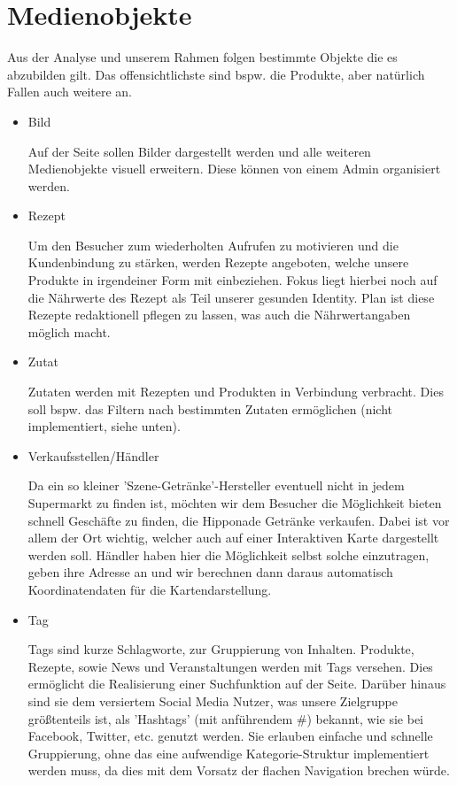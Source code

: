 \documentclass[12pt,a4paper,oneside,ngerman]{article}
\begin{document}
\section{Medienobjekte} %
Aus der Analyse und unserem Rahmen folgen bestimmte Objekte die es abzubilden gilt. Das offensichtlichste sind bspw. die Produkte, aber natürlich Fallen auch weitere an.
\begin{itemize}
\item Bild

Auf der Seite sollen Bilder dargestellt werden und alle weiteren Medienobjekte visuell erweitern. Diese können von einem Admin organisiert werden.

\item Rezept

Um den Besucher zum wiederholten Aufrufen zu motivieren und die Kundenbindung zu stärken, werden Rezepte angeboten, welche unsere Produkte in irgendeiner Form mit einbeziehen.
Fokus liegt hierbei noch auf die Nährwerte des Rezept als Teil unserer gesunden Identity.
Plan ist diese Rezepte redaktionell pflegen zu lassen, was auch die Nährwertangaben möglich macht.

\item Zutat

Zutaten werden mit Rezepten und Produkten in Verbindung verbracht. Dies soll bspw. das Filtern nach bestimmten Zutaten ermöglichen (nicht implementiert, siehe unten).

\item Verkaufsstellen/Händler

Da ein so kleiner 'Szene-Getränke'-Hersteller eventuell nicht in jedem Supermarkt zu finden ist, möchten wir dem Besucher die Möglichkeit bieten schnell Geschäfte zu finden, die Hipponade Getränke verkaufen. 
Dabei ist vor allem der Ort wichtig, welcher auch auf einer Interaktiven Karte dargestellt werden soll.
Händler haben hier die Möglichkeit selbst solche einzutragen, geben ihre Adresse an und wir berechnen dann daraus automatisch Koordinatendaten für die Kartendarstellung.

\item Tag

Tags sind kurze Schlagworte, zur Gruppierung von Inhalten.
Produkte, Rezepte, sowie News und Veranstaltungen werden mit Tags versehen. Dies ermöglicht die Realisierung einer Suchfunktion auf der Seite. 
Darüber hinaus sind sie dem versiertem Social Media Nutzer, was unsere Zielgruppe größtenteils ist, als 'Hashtags' (mit anführendem \#) bekannt, wie sie bei Facebook, Twitter, etc. genutzt werden. 
Sie erlauben einfache und schnelle Gruppierung, ohne das eine aufwendige Kategorie-Struktur implementiert werden muss, da dies mit dem Vorsatz der flachen Navigation brechen würde.


\end{itemize}
\end{document}
